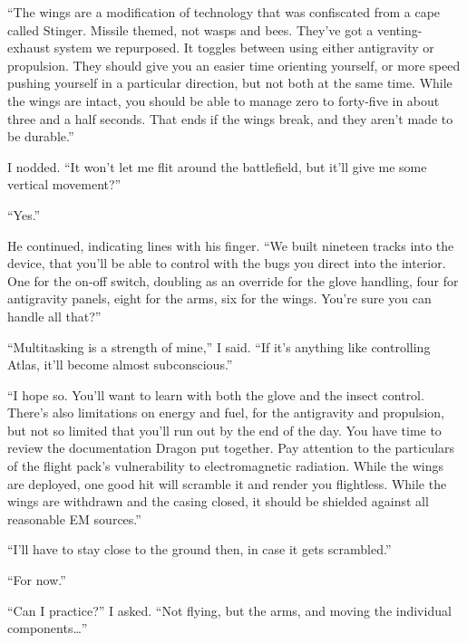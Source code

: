 ``The wings are a modification of technology that was confiscated from a cape called Stinger.  Missile themed, not wasps and bees.  They've got a venting-exhaust system we repurposed.  It toggles between using either antigravity or propulsion.  They should give you an easier time orienting yourself, or more speed pushing yourself in a particular direction, but not both at the same time.   While the wings are intact, you should be able to manage zero to forty-five in about three and a half seconds.  That ends if the wings break, and they aren't made to be durable.''



I nodded.  ``It won't let me flit around the battlefield, but it'll give me some vertical movement?''



``Yes.''



He continued, indicating lines with his finger.  ``We built nineteen tracks into the device, that you'll be able to control with the bugs you direct into the interior.  One for the on-off switch, doubling as an override for the glove handling, four for antigravity panels, eight for the arms, six for the wings.  You're sure you can handle all that?''



``Multitasking is a strength of mine,'' I said.  ``If it's anything like controlling Atlas, it'll become almost subconscious.''



``I hope so.  You'll want to learn with both the glove and the insect control.  There's also limitations on energy and fuel, for the antigravity and propulsion, but not so limited that you'll run out by the end of the day.  You have time to review the documentation Dragon put together.  Pay attention to the particulars of the flight pack's vulnerability to electromagnetic radiation.  While the wings are deployed, one good hit will scramble it and render you flightless.  While the wings are withdrawn and the casing closed, it should be shielded against all reasonable EM sources.''



``I'll have to stay close to the ground then, in case it gets scrambled.''



``For now.''



``Can I practice?'' I asked.  ``Not flying, but the arms, and moving the individual components\ldots''



